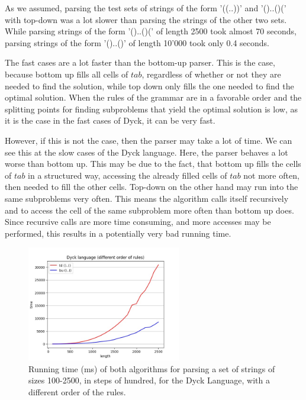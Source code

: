 As we assumed, parsing the test sets of strings of the form '((..))' and '()..()(' with top-down was a lot slower than parsing the strings of the other two sets.
While parsing strings of the form '()..()(' of length 2500 took almost 70 seconds, parsing strings of the form '()..()' of length 10'000 took only 0.4 seconds.

The fast cases are a lot faster than the bottom-up parser.
This is the case, because bottom up fills all cells of $tab$, regardless of whether or not they are needed to find the solution, while top down only fills the one needed to find the optimal solution.
When the rules of the grammar are in a favorable order and the splitting points for finding subproblems that yield the optimal solution is low, as it is the case in the fast cases of Dyck, it can be very fast.

However, if this is not the case, then the parser may take a lot of time.
We can see this at the slow cases of the Dyck language.
Here, the parser behaves a lot worse than bottom up.
This may be due to the fact, that bottom up fills the cells of $tab$ in a structured way, accessing the already filled cells of $tab$ not more often, then needed to fill the other cells.
Top-down on the other hand may run into the same subproblems very often.
This means the algorithm calls itself recursively and to access the cell of the same subproblem more often than bottom up does.
Since recursive calls are more time consuming, and more accesses may be performed, this results in a potentially very bad running time.

\begin{figure}[h!]
    \centering
    \includegraphics[width=0.6\textwidth]{Images/t_dyck_order.jpg}
    \caption{Running time (ms) of both algorithms for parsing a set of strings of sizes 100-2500, in steps of hundred, for the Dyck Language, with a different order of the rules.}
    \label{fig:t_dyck_order}
\end{figure}

